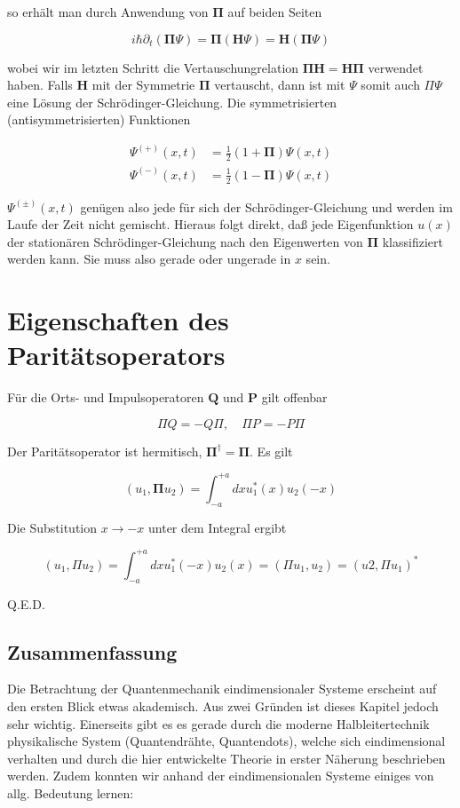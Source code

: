 \documentclass[10pt, letterpaper]{article}
\begin{document}
so erhält man durch Anwendung von $\boldsymbol{\Pi}$ auf beiden Seiten

$$
i \hbar \partial_{t}(\boldsymbol{\Pi} \Psi)=\boldsymbol{\Pi}(\mathbf{H} \Psi)=\mathbf{H}(\boldsymbol{\Pi} \Psi)
$$

wobei wir im letzten Schritt die Vertauschungrelation $\boldsymbol{\Pi} \mathbf{H}=\mathbf{H} \boldsymbol{\Pi}$ verwendet haben. Falls $\mathbf{H}$ mit der Symmetrie $\boldsymbol{\Pi}$ vertauscht, dann ist mit $\Psi$ somit auch $\Pi \Psi$ eine Lösung der Schrödinger-Gleichung. Die symmetrisierten (antisymmetrisierten) Funktionen

$$
\begin{aligned}
\Psi^{(+)}(x, t) & =\frac{1}{2}(1+\boldsymbol{\Pi}) \Psi(x, t) \\
\Psi^{(-)}(x, t) & =\frac{1}{2}(1-\boldsymbol{\Pi}) \Psi(x, t)
\end{aligned}
$$

$\Psi^{( \pm)}(x, t)$ genügen also jede für sich der Schrödinger-Gleichung und werden im Laufe der Zeit nicht gemischt. Hieraus folgt direkt, daß jede Eigenfunktion $u(x)$ der stationären Schrödinger-Gleichung nach den Eigenwerten von $\boldsymbol{\Pi}$ klassifiziert werden kann. Sie muss also gerade oder ungerade in $x$ sein.

\section*{Eigenschaften des Paritätsoperators}
Für die Orts- und Impulsoperatoren $\mathbf{Q}$ und $\mathbf{P}$ gilt offenbar

$$
\Pi Q=-Q \Pi, \quad \Pi P=-P \Pi
$$

Der Paritätsoperator ist hermitisch, $\boldsymbol{\Pi}^{\dagger}=\boldsymbol{\Pi}$. Es gilt

$$
\left(u_{1}, \boldsymbol{\Pi} u_{2}\right)=\int_{-a}^{+a} d x u_{1}^{*}(x) u_{2}(-x)
$$

Die Substitution $x \rightarrow-x$ unter dem Integral ergibt

$$
\left(u_{1}, \Pi u_{2}\right)=\int_{-a}^{+a} d x u_{1}^{*}(-x) u_{2}(x)=\left(\Pi u_{1}, u_{2}\right)=\left(u 2, \Pi u_{1}\right)^{*}
$$

Q.E.D.

\subsection*{Zusammenfassung}
Die Betrachtung der Quantenmechanik eindimensionaler Systeme erscheint auf den ersten Blick etwas akademisch. Aus zwei Gründen ist dieses Kapitel jedoch sehr wichtig. Einerseits gibt es es gerade durch die moderne Halbleitertechnik physikalische System (Quantendrähte, Quantendots), welche sich eindimensional verhalten und durch die hier entwickelte Theorie in erster Näherung beschrieben werden. Zudem konnten wir anhand der eindimensionalen Systeme einiges von allg. Bedeutung lernen:
\end{document}
